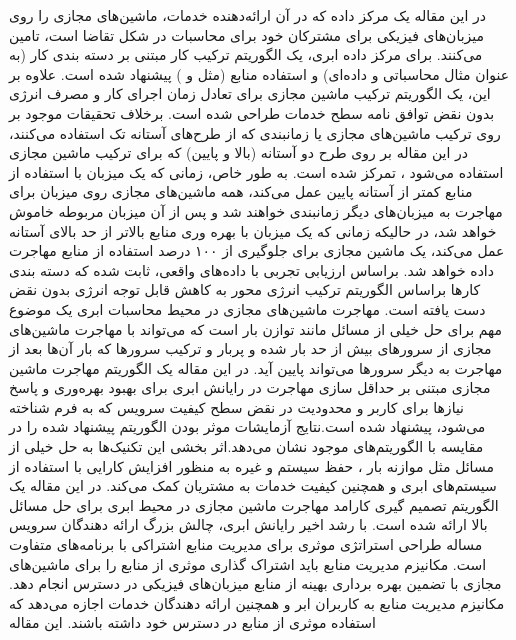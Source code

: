 در این مقاله
\cite{num8}
یک مرکز داده که در آن ارائه‌دهنده خدمات، ماشین‌های مجازی را روی میزبان‌های فیزیکی برای مشترکان خود برای محاسبات در شکل تقاضا است، تامین می‌کنند. برای مرکز داده ابری، یک الگوریتم ترکیب کار مبتنی بر دسته بندی کار (به عنوان مثال محاسباتی و داده‌ای) و استفاده منابع (مثل 
  و
   ) پیشنهاد شده است. علاوه بر این، یک الگوریتم ترکیب ماشین مجازی برای تعادل زمان اجرای کار و مصرف انرژی بدون نقض توافق نامه سطح خدمات
     طراحی شده است. برخلاف تحقیقات موجود بر روی ترکیب ماشین‌های مجازی یا زمانبندی که از طرح‌های آستانه تک استفاده می‌کنند، در این مقاله بر روی  طرح دو آستانه (بالا و پایین) که برای ترکیب ماشین مجازی استفاده می‌شود ، تمرکز شده است. به طور خاص، زمانی که یک میزبان با استفاده از منابع کمتر از آستانه پایین عمل می‌کند، همه ماشین‌های مجازی روی میزبان برای مهاجرت به میزبان‌های دیگر زمانبندی خواهند شد و پس از آن میزبان مربوطه خاموش خواهد شد، در حالیکه زمانی که یک میزبان با بهره وری منابع بالاتر از حد بالای آستانه عمل می‌کند، یک ماشین مجازی برای جلوگیری از  ۱۰۰ درصد استفاده از منابع مهاجرت داده خواهد شد. براساس ارزیابی تجربی با داده‌های واقعی، ثابت شده که دسته بندی کارها براساس الگوریتم ترکیب انرژی محور به کاهش قابل توجه انرژی بدون نقض 
       دست یافته است.
  مهاجرت ماشین‌های مجازی در محیط محاسبات ابری یک موضوع مهم برای حل خیلی از مسائل مانند توازن بار است که می‌تواند با  مهاجرت ماشین‌های مجازی از سرورهای بیش از حد بار شده و پربار و ترکیب سرورها که بار آن‌ها بعد از مهاجرت به دیگر سرورها می‌تواند پایین آید. در این مقاله
\cite{num9}
  یک الگوریتم مهاجرت ماشین مجازی مبتنی بر حداقل سازی مهاجرت در رایانش ابری برای بهبود بهره‌وری و پاسخ نیازها برای کاربر و محدودیت در نقض سطح کیفیت سرویس که به فرم 
    شناخته می‌شود، پیشنهاد شده است.نتایج آزمایشات موثر بودن الگوریتم پیشنهاد شده 
    را در مقایسه با الگوریتم‌های موجود نشان می‌دهد.اثر بخشی این تکنیک‌ها به حل خیلی از مسائل مثل موازنه بار ، حفظ سیستم  و غیره به منظور افزایش کارایی با استفاده از سیستم‌های ابری  و همچنین کیفیت خدمات به  مشتریان کمک می‌کند. در این مقاله یک الگوریتم تصمیم گیری کارامد مهاجرت ماشین مجازی در محیط ابری برای حل مسائل بالا ارائه شده است. 
     با رشد اخیر رایانش ابری، چالش بزرگ ارائه دهندگان سرویس مساله طراحی استراتژی موثری برای مدیریت منابع اشتراکی با برنامه‌های متفاوت است. مکانیزم مدیریت منابع باید اشتراک گذاری موثری از منابع را برای ماشین‌های مجازی با تضمین بهره برداری بهینه از منابع میزبان‌های فیزیکی در دسترس انجام دهد. مکانیزم مدیریت منابع به کاربران ابر و همچنین ارائه دهندگان خدمات اجازه می‌دهد که استفاده موثری از منابع در دسترس خود داشته باشند. این مقاله
